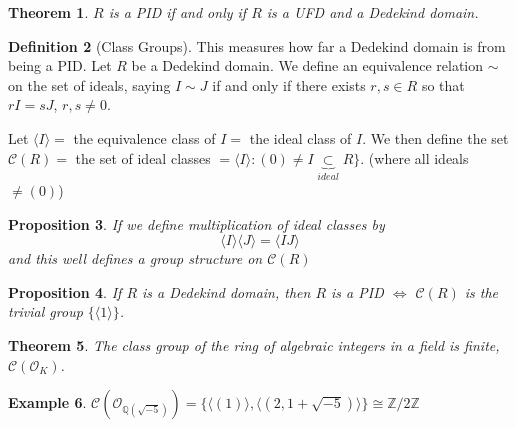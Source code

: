\documentclass[12pt]{article}
\newtheorem{thm}{Theorem}[section]
\newtheorem{prop}[thm]{Proposition}
\theoremstyle{definition}
\newtheorem{defn}[thm]{Definition}
\newtheorem{eg}[thm]{Example}
\theoremstyle{remark}
\numberwithin{equation}{section}
\newcommand\Z{\mathbb Z}    %
\newcommand\Q{\mathbb Q}    %
\begin{document}
\vspace{15pt}

\begin{thm}
        $R$ is a PID if and only if $R$ is a UFD and a Dedekind domain.
\end{thm}


\vspace{15pt}

\begin{defn}[Class Groups]
        This measures how far a Dedekind domain is from being a PID. Let $R$ be a Dedekind domain. We define an equivalence relation $\sim$ on the set of ideals, saying $I\sim J$ if and only if there exists $r,s \in R$ so that $rI = sJ$, $r,s \neq 0$.

        Let $\langle I \rangle = $ the equivalence class of $I = $ the ideal class of $I$. We then define the set $\mathcal{C}(R) =  $ the set of ideal classes $= \langle I \rangle: (0) \neq I \underbrace{\subset}_{ideal} R\}$. (where all ideals $\neq (0)$)
\end{defn}

\vspace{15pt}

\begin{prop}
        If we define multiplication of ideal classes by \begin{equation}
                \langle I \rangle \langle J \rangle = \langle IJ \rangle
        \end{equation}
        and this well defines a group structure on $\mathcal{C}(R)$
\end{prop}

\vspace{15pt}

\begin{prop}
        If $R$ is a Dedekind domain, then $R$ is a PID $\iff$ $\mathcal{C}(R)$ is the trivial group $\{\langle 1 \rangle\}$.
\end{prop}

\vspace{15pt}

\begin{thm}
        The class group of the ring of algebraic integers in a field is finite, $\mathcal{C}(\mathcal{O}_K)$.
\end{thm}

\vspace{15pt}

\begin{eg}
        $\mathcal{C}(\mathcal{O}_{\Q(\sqrt{-5})}) = \{\langle (1)\rangle, \langle (2,1+\sqrt{-5})\rangle\} \cong \Z/2\Z$
\end{eg}
\end{document}
